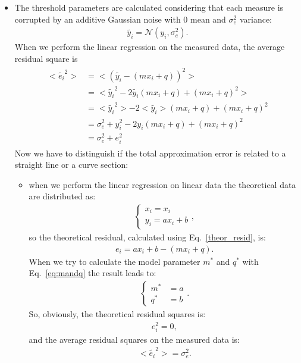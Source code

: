 \begin{itemize}
\item The threshold parameters are calculated considering that each measure is corrupted by an additive Gaussian noise with 0 mean and $\sigma_e^2$ variance: 
\begin{align}
\tilde{y_i} = \mathcal{N}(y_i,\sigma_e^2) .
\end{align}
When we perform the linear regression on the measured data, the average residual square is 
\begin{align}
\begin{split}
<\tilde{e_i}^2> &= <(\tilde{y_i} - (mx_i + q))^2>  \\[5pt]
&= <\tilde{y_i}^2 - 2\tilde{y_i}(mx_i + q) + (mx_i + q)^2>  \\[5pt]
&= <\tilde{y_i}^2> - 2<\tilde{y_i}>(mx_i + q) + (mx_i + q)^2 \\[5pt]
&=  \sigma_e^2 + y_i^2  - 2y_i(mx_i + q) + (mx_i + q)^2  \\[5pt]
&=  \sigma_e^2 + e_i^2 
\end{split}
\end{align}
Now we have to distinguish if the total approximation error is related to a straight line or a curve section:
\begin{itemize}
\item when we perform the linear regression on linear data the theoretical data are distributed as:
\begin{align}
\begin{cases}
x_i = x_i \\[5pt]
y_i = ax_i + b
\end{cases},
\end{align} 
so the theoretical residual, calculated using Eq.~\eqref{theor_resid}, is: 
\begin{align}
e_i = ax_i + b - (mx_i + q).
\end{align}
When we try to calculate the model parameter $m^*$ and $q^*$ with Eq.~\eqref{eq:mandq}  the result leads to:
 \begin{align}
\begin{cases}
m^* &= a  \\[5pt]
q^* &= b
\end{cases}.
\label{eq:mandqcirum}
\end{align}
So, obviously, the theoretical residual squares is:
\begin{align}
e_i^2  = 0,
\end{align} 
and the average residual squares on the measured data is:
\begin{align}
<\tilde{e_i}^2>  = \sigma_e^2.

\end{align}
\end{itemize}
\end{itemize}
